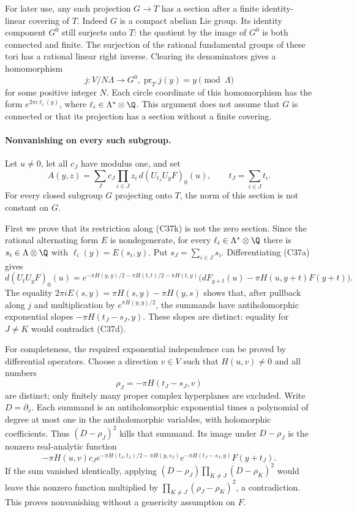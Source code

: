 For later use, any such projection $G\to T$ has a section after
a finite identity-linear covering of $T$.  Indeed $G$ is a
compact abelian Lie group.  Its identity component $G^0$ still
surjects onto $T$: the quotient by the image of $G^0$ is both
connected and finite.  The surjection of the rational fundamental
groups of these tori has a rational linear right inverse.
Clearing its denominators gives a homomorphism
\[
 j:V/N\Lambda\longrightarrow G^0,
       \operatorname{pr}_Tj(y)=y\pmod\Lambda
 \tag{C37k}
\]
for some positive integer $N$.  Each circle coordinate of this
homomorphism has the form $e^{2\pi i\ell_i(y)}$, where
$\ell_i\in\Lambda^*\otimes\Q$.  This argument does not assume
that $G$ is connected or that its projection has a section
without a finite covering.

\paragraph{Nonvanishing on every such subgroup.}
Let $u\ne0$, let all $c_J$ have modulus one, and set
\[
 A(y,z)=\sum_J c_J\prod_{i\in J}z_i\,
                       d(U_{t_J}U_yF)_0(u),
       \qquad t_J=\sum_{i\in J}t_i.
 \tag{C37l}
\]
For every closed subgroup $G$ projecting onto $T$, the norm of
this section is not constant on $G$.

First we prove that its restriction along (C37k) is not the zero
section.  Since the rational alternating form $E$ is
nondegenerate, for every $\ell_i\in\Lambda^*\otimes\Q$ there
is $s_i\in\Lambda\otimes\Q$ with $\ell_i(y)=E(s_i,y)$.
Put $s_J=\sum_{i\in J}s_i$.  Differentiating (C37a) gives
\[
 d(U_tU_yF)_0(u)=
 e^{-\pi H(y,y)/2-\pi H(t,t)/2-\pi H(t,y)}
 \bigl(dF_{y+t}(u)-\pi H(u,y+t)F(y+t)\bigr).
 \tag{C37m}
\]
The equality
$2\pi iE(s,y)=\pi H(s,y)-\pi H(y,s)$ shows that, after
pullback along $j$ and multiplication by $e^{\pi H(y,y)/2}$,
the summands have antiholomorphic exponential slopes
$-\pi H(t_J-s_J,y)$.  These slopes are distinct: equality for
$J\ne K$ would contradict (C37d).

For completeness, the required exponential independence can be
proved by differential operators.  Choose a direction $v\in V$
such that $H(u,v)\ne0$ and all numbers
\[
           \rho_J=-\pi H(t_J-s_J,v)
\]
are distinct; only finitely many proper complex hyperplanes
are excluded.  Write $D=\partial_{\bar v}$.  Each summand is
an antiholomorphic exponential times a polynomial of degree at
most one in the antiholomorphic variables, with holomorphic
coefficients.  Thus $(D-\rho_J)^2$ kills that summand.
Its image under $D-\rho_J$ is the nonzero real-analytic function
\[
 -\pi H(u,v)c_J
 e^{-\pi H(t_J,t_J)/2-\pi H(y,s_J)}
 e^{-\pi H(t_J-s_J,y)}F(y+t_J).
\]
If the sum vanished identically, applying
$(D-\rho_J)\prod_{K\ne J}(D-\rho_K)^2$ would leave this
nonzero function multiplied by
$\prod_{K\ne J}(\rho_J-\rho_K)^2$, a contradiction.
This proves nonvanishing without a genericity assumption on $F$.

